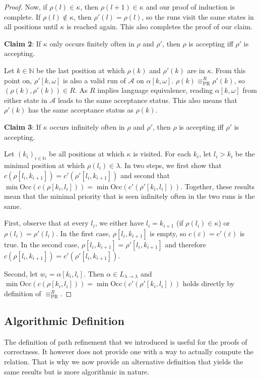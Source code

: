 \begin{proof}
	Now, if $\rho(l) \in \kappa$, then $\rho(l+1) \in \kappa$ and our proof of induction is complete. If $\rho(l) \notin \kappa$, then $\rho'(l) = \rho(l)$, so the runs visit the same states in all positions until $\kappa$ is reached again. This also completes the proof of our claim.
	
	\vspace{5pt}
	\textbf{Claim 2}: If $\kappa$ only occurs finitely often in $\rho$ and $\rho'$, then $\rho$ is accepting iff $\rho'$ is accepting.
	
	Let $k \in \mathbb{N}$ be the last position at which $\rho(k)$ and $\rho'(k)$ are in $\kappa$. From this point on, $\rho'[k, \omega]$ is also a valid run of $\mathcal{A}$ on $\alpha[k, \omega]$. $\rho(k) \equiv_\text{PR}^R \rho'(k)$, so $(\rho(k), \rho'(k)) \in R$. As $R$ implies language equivalence, reading $\alpha[k, \omega]$ from either state in $\mathcal{A}$ leads to the same acceptance status. This also means that $\rho'(k)$ has the same acceptance status as $\rho(k)$.
	
	\vspace{5pt}
	\textbf{Claim 3}: If $\kappa$ occurs infinitely often in $\rho$ and $\rho'$, then $\rho$ is accepting iff $\rho'$ is accepting.
	
	Let $(k_i)_{i \in \mathbb{N}}$ be all positions at which $\kappa$ is visited. For each $k_i$, let $l_i > k_i$ be the minimal position at which $\rho(l_i) \in \lambda$. In two steps, we first show that $c(\rho[l_i, k_{i+1}]) = c'(\rho'[l_i, k_{i+1}])$ and second that $\min \text{Occ}(c(\rho[k_i, l_i])) = \min \text{Occ}(c'(\rho'[k_i, l_i]))$. Together, these results mean that the minimal priority that is seen infinitely often in the two runs is the same.
	
	First, observe that at every $l_i$, we either have $l_i = k_{i+1}$ (if $\rho(l_i) \in \kappa$) or $\rho(l_i) = \rho'(l_i)$. In the first case, $\rho[l_i, k_{i+1}]$ is empty, so $c(\varepsilon) = c'(\varepsilon)$ is true. In the second case, $\rho[l_i, k_{i+1}] = \rho'[l_i, k_{i+1}]$ and therefore $c(\rho[l_i, k_{i+1}]) = c'(\rho'[l_i, k_{i+1}])$.
	
	Second, let $w_i = \alpha[k_i, l_i]$. Then $\alpha \in L_{\lambda \rightarrow \lambda}$ and $\min \text{Occ}(c(\rho[k_i, l_i])) = \min \text{Occ}(c'(\rho'[k_i, l_i]))$ holds directly by definition of $\equiv_\text{PR}^R$.
\end{proof}



\subsection{Algorithmic Definition}
The definition of path refinement that we introduced is useful for the proofs of correctness. It however does not provide one with a way to actually compute the relation. That is why we now provide an alternative definition that yields the same results but is more algorithmic in nature.

